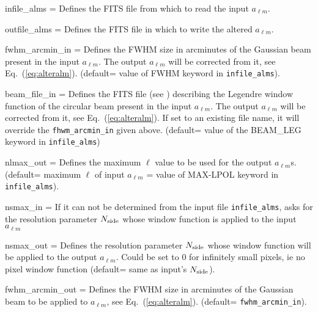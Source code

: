 \begin{qualifiers}
  \begin{qulist}{} %
    \item[{infile\_alms = }]%
 Defines the FITS file from which to read the input
	$a_{\ell m}$.
    \item[{outfile\_alms = }]%
 Defines the FITS file in which to write the altered
	$a_{\ell m}$.
    \item[{fwhm\_arcmin\_in = }]%
 Defines the FWHM size in arcminutes 
      of the Gaussian beam present in the input $a_{\ell m}$. The output $a_{\ell m}$ will be
      corrected from it, see Eq.~(\ref{eq:alteralm}). (default= value of FWHM keyword in {\tt infile\_alms}).
    \item[{beam\_file\_in = }]%
 Defines the FITS file (see ) describing the
      Legendre window function of the circular beam present in the input $a_{\ell m}$. The output $a_{\ell m}$ will be
      corrected from it, see Eq.~(\ref{eq:alteralm}). If set to an existing file name, it will override the
    {\tt fhwm\_arcmin\_in} given above. (default= value of the BEAM\_LEG keyword in {\tt infile\_alms})
     \item[{nlmax\_out = }]%
 Defines the maximum $\ell$ value 
       to be used for the output $a_{\ell m}$s. (default= maximum $\ell$ of input
       $a_{\ell m}$ = value of MAX-LPOL keyword in {\tt infile\_alms}).
     \item[{nsmax\_in = }]%
 If it can not be determined from the input file {\tt infile\_alms}, asks
       for the \healpix resolution parameter ${N_{\textrm{side}}}$ whose
       window function is applied to the input $a_{\ell m}$
     \item[{nsmax\_out = }]%
 Defines the \healpix resolution parameter ${N_{\textrm{side}}}$ whose
       window function will be applied to the output $a_{\ell m}$. Could be set
       to 0 for infinitely small pixels, ie no pixel window function (default= same as input's ${N_{\textrm{side}}}$).
    \item[{fwhm\_arcmin\_out = }]%
 Defines the FWHM size in arcminutes 
      of the Gaussian beam to be applied to $a_{\ell m}$, see
      Eq.~(\ref{eq:alteralm}). (default= {\tt fwhm\_arcmin\_in}).

\end{qulist}
\end{qualifiers}
